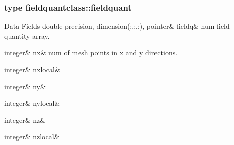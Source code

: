 \subsubsection{type fieldquantclass\+::fieldquant}
\begin{DoxyFields}{Data Fields}
\mbox{\label{namespacefieldquantclass_a3d25be64f02ec3fd9be9700006e6e4f3}} 
double precision, dimension(:,:,:), pointer&
fieldq&
num field quantity array. \\
\hline

\mbox{\label{namespacefieldquantclass_a7e825dc6a0487f44528fad55e632cc70}} 
integer&
nx&
num of mesh points in x and y directions. \\
\hline

\mbox{\label{namespacefieldquantclass_a7caab2ebce71f57176a519933b7e2666}} 
integer&
nxlocal&
\\
\hline

\mbox{\label{namespacefieldquantclass_a400586052c8deb7240b215eee62b89e9}} 
integer&
ny&
\\
\hline

\mbox{\label{namespacefieldquantclass_a3c9290ff97ebcaf272c17ed3975a18e1}} 
integer&
nylocal&
\\
\hline

\mbox{\label{namespacefieldquantclass_a6f78161e325887e087580ad729a35d0b}} 
integer&
nz&
\\
\hline

\mbox{\label{namespacefieldquantclass_aa91a76fdf699b94c32a92a2b2fa2451d}} 
integer&
nzlocal&
\\
\hline

\end{DoxyFields}
